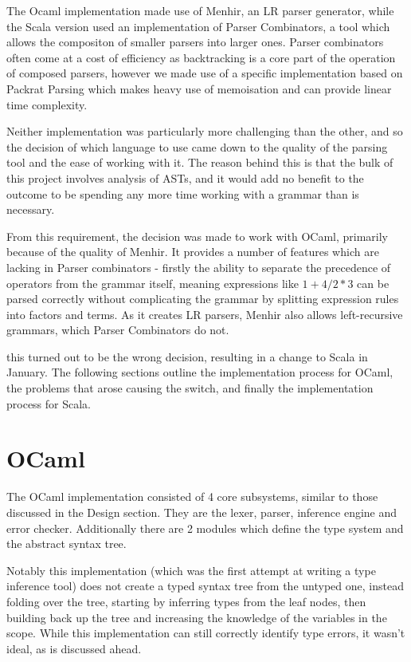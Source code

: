 \documentclass[british, twoside]{bhamthesis}
\theoremstyle{definition}
\begin{document}
  The Ocaml implementation made use of Menhir, an LR parser generator, while the Scala version used an implementation of Parser Combinators\autocite{Hutton1996}, a tool which allows the compositon of smaller parsers into larger ones. Parser combinators often come at a cost of efficiency as backtracking is a core part of the operation of composed parsers, however we made use of a specific implementation based on Packrat Parsing\autocite{Ford2006} which makes heavy use of memoisation and can provide linear time complexity.

  Neither implementation was particularly more challenging than the other, and so the decision of which language to use came down to the quality of the parsing tool and the ease of working with it. The reason behind this is that the bulk of this project involves analysis of ASTs, and it would add no benefit to the outcome to be spending any more time working with a grammar than is necessary.

  From this requirement, the decision was made to work with OCaml, primarily because of the quality of Menhir. It provides a number of features which are lacking in Parser combinators - firstly the ability to separate the precedence of operators from the grammar itself, meaning expressions like $1 + 4 / 2 * 3$ can be parsed correctly without complicating the grammar by splitting expression rules into factors and terms. As it creates LR parsers, Menhir also allows left-recursive grammars, which Parser Combinators do not.

  this turned out to be the wrong decision, resulting in a change to Scala in January. The following sections outline the implementation process for OCaml, the problems that arose causing the switch, and finally the implementation process for Scala.

  \section{OCaml}
    The OCaml implementation consisted of 4 core subsystems, similar to those discussed in the Design section. They are the lexer, parser, inference engine and error checker. Additionally there are 2 modules which define the type system and the abstract syntax tree.

    Notably this implementation (which was the first attempt at writing a type inference tool) does not create a typed syntax tree from the untyped one, instead folding over the tree, starting by inferring types from the leaf nodes, then building back up the tree and increasing the knowledge of the variables in the scope. While this implementation can still correctly identify type errors, it wasn't ideal, as is discussed ahead.
\end{document}
